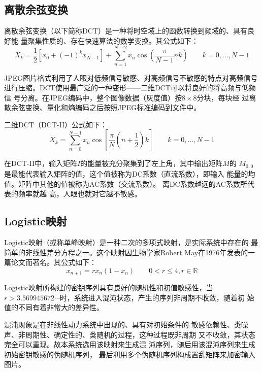 \subsection{离散余弦变换}
离散余弦变换（以下简称DCT）是一种将时空域上的函数转换到频域的、具有良好能
量聚集性质的、存在快速算法的数学变换。其公式如下：
\begin{displaymath}
X_k = \frac1 2 \left[x_0 + \left(-1\right)^k x_{N - 1}\right] + \sum_{n = 1}^{N - 2} x_n \cos \left(
        \frac{\pi} {N - 1} n k \right) \qquad k = 0, \dotsc, N - 1
\end{displaymath}

JPEG图片格式利用了人眼对低频信号敏感、对高频信号不敏感的特点对高频信号
进行压缩。DCT使用最广泛的一种变形——二维DCT可以将良好的将高频与低频信
号分离。在JPEG编码中，整个图像数据（灰度值）按$8 \times 8$分块，每块经
过离散余弦变换、量化和熵编码之后按照JPEG标准编码到文件中。

二维DCT（DCT-II）公式如下：
\begin{displaymath}
X_k = \sum_{n = 0}^{N - 1} x_n \cos \left[\frac{\pi} N \left(n +
        \frac1 2\right) k\right] \qquad k = 0, \dotsc, N - 1
\end{displaymath}

在DCT-II中，输入矩阵$I$的能量被充分聚集到了左上角，其中输出矩阵$M$的
$M_{0, 0}$是最能代表输入矩阵的值，这个值被称为DC系数（直流系数），即输入
能量的均值。矩阵中其他的值被称为AC系数（交流系数）。
离DC系数越远的AC系数所代表的频率就越
高，人眼也就对它越不敏感。



\subsection{Logistic映射}
Logistic映射（或称单峰映射）是一种二次的多项式映射，是实际系统中存在的
最简单的非线性差分方程之一\cite{yang2011}。这个映射因生物学家Robert
May在1976年发表的一篇论文而著名。其公式如下：
\begin{displaymath}
x_{n + 1} = rx_n(1 - x_n) \qquad 0 < r \leq 4, r \in \mathbb{R}
\end{displaymath}

Logistic映射所构建的密钥序列具有良好的随机性和初值敏感性，当$r >
3.569945672\dotsb$时，系统进入混沌状态，产生的序列非周期不收敛，随着初
始值的不同有着非常大的差异性\cite{yang2011}。

混沌现象是在非线性动力系统中出现的、具有对初始条件的
敏感依赖性、类噪声、非周期性、确定性的、类随机的过程，这种过程既非周期
又不收敛，其状态完全可以重现\cite{lu2007}。故本系统选用该映射来生成混
沌序列，随后用该混沌序列来生成初始密钥敏感的伪随机序列，
最后利用多个伪随机序列构成置乱矩阵来加密输入图片。


